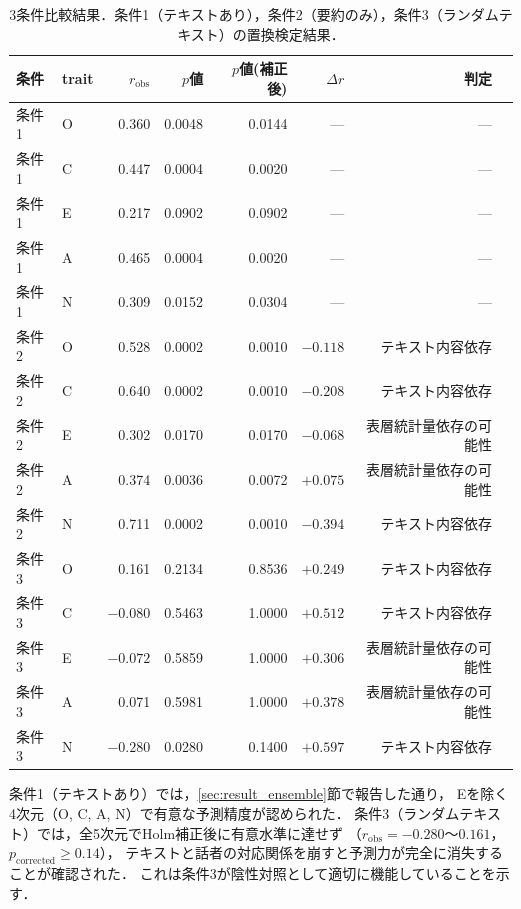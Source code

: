 \documentclass[dvipdfmx,11pt,a4paper]{bxjsarticle}
\begin{document}
\begin{table}[htbp]
\centering
\caption{3条件比較結果．条件1（テキストあり），条件2（要約のみ），条件3（ランダムテキスト）の置換検定結果．}
\label{tab:baseline_comparison}
\begin{tabular}{llrrrrrl}
\toprule
条件 & trait & $r_{\text{obs}}$ & $p$値 & $p$値(補正後) & $\Delta r$ & 判定 \\
\midrule
条件1 & O & 0.360 & 0.0048 & 0.0144 & --- & --- \\
条件1 & C & 0.447 & 0.0004 & 0.0020 & --- & --- \\
条件1 & E & 0.217 & 0.0902 & 0.0902 & --- & --- \\
条件1 & A & 0.465 & 0.0004 & 0.0020 & --- & --- \\
条件1 & N & 0.309 & 0.0152 & 0.0304 & --- & --- \\
\midrule
条件2 & O & 0.528 & 0.0002 & 0.0010 & $-0.118$ & テキスト内容依存 \\
条件2 & C & 0.640 & 0.0002 & 0.0010 & $-0.208$ & テキスト内容依存 \\
条件2 & E & 0.302 & 0.0170 & 0.0170 & $-0.068$ & 表層統計量依存の可能性 \\
条件2 & A & 0.374 & 0.0036 & 0.0072 & $+0.075$ & 表層統計量依存の可能性 \\
条件2 & N & 0.711 & 0.0002 & 0.0010 & $-0.394$ & テキスト内容依存 \\
\midrule
条件3 & O & 0.161 & 0.2134 & 0.8536 & $+0.249$ & テキスト内容依存 \\
条件3 & C & $-0.080$ & 0.5463 & 1.0000 & $+0.512$ & テキスト内容依存 \\
条件3 & E & $-0.072$ & 0.5859 & 1.0000 & $+0.306$ & 表層統計量依存の可能性 \\
条件3 & A & 0.071 & 0.5981 & 1.0000 & $+0.378$ & 表層統計量依存の可能性 \\
条件3 & N & $-0.280$ & 0.0280 & 0.1400 & $+0.597$ & テキスト内容依存 \\
\bottomrule
\end{tabular}
\end{table}

条件1（テキストあり）では，\ref{sec:result_ensemble}節で報告した通り，
Eを除く4次元（O, C, A, N）で有意な予測精度が認められた．
条件3（ランダムテキスト）では，全5次元でHolm補正後に有意水準に達せず
（$r_{\text{obs}} = -0.280$〜$0.161$，$p_{\text{corrected}} \geq 0.14$），
テキストと話者の対応関係を崩すと予測力が完全に消失することが確認された．
これは条件3が陰性対照として適切に機能していることを示す．
\end{document}
